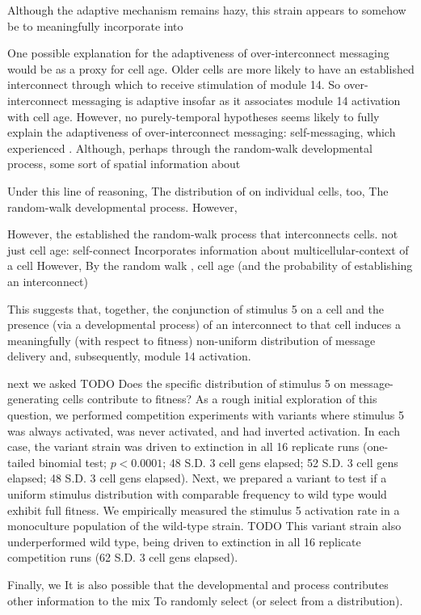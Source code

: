 Although the adaptive mechanism remains hazy, this strain appears to somehow be to meaningfully incorporate into

One possible explanation for the adaptiveness of over-interconnect messaging would be as a proxy for cell age.
Older cells are more likely to have an established interconnect through which to receive stimulation of module 14.
So over-interconnect messaging is adaptive insofar as it associates module 14 activation with cell age.
However, no purely-temporal hypotheses seems likely to fully explain the adaptiveness of over-interconnect messaging:
self-messaging, which experienced .
Although, perhaps through the random-walk developmental process, some sort of spatial information about

Under this line of reasoning,
The distribution of on individual cells, too,
The random-walk developmental process.
However,

However, the established
the random-walk process that interconnects cells.
not just cell age: self-connect
Incorporates information about multicellular-context of a cell
However,
By the random walk , cell age (and the probability of establishing an interconnect)


This suggests that, together, the conjunction of stimulus 5 on a cell and the presence (via a developmental process) of an interconnect to that cell induces a meaningfully (with respect to fitness) non-uniform distribution of message delivery and, subsequently, module 14 activation.

next we asked TODO
Does the specific distribution of stimulus 5 on message-generating cells contribute to fitness?
As a rough initial exploration of this question, we performed competition experiments with variants where stimulus 5 was always activated, was never activated, and had inverted activation.
In each case, the variant strain was driven to extinction in all 16 replicate runs (one-tailed binomial test; $p < 0.0001$; 48 S.D. 3 cell gens elapsed; 52 S.D. 3 cell gens elapsed; 48 S.D. 3 cell gens elapsed).
Next, we prepared a variant to test if a uniform stimulus distribution with comparable frequency to wild type would exhibit full fitness.
We empirically measured the stimulus 5 activation rate in a monoculture population of the wild-type strain. TODO
This variant strain also underperformed wild type, being driven to extinction in all 16 replicate competition runs (62 S.D. 3 cell gens elapsed).

Finally, we
It is also possible that the developmental and process contributes other information to the mix
To randomly select (or select from a distribution).




